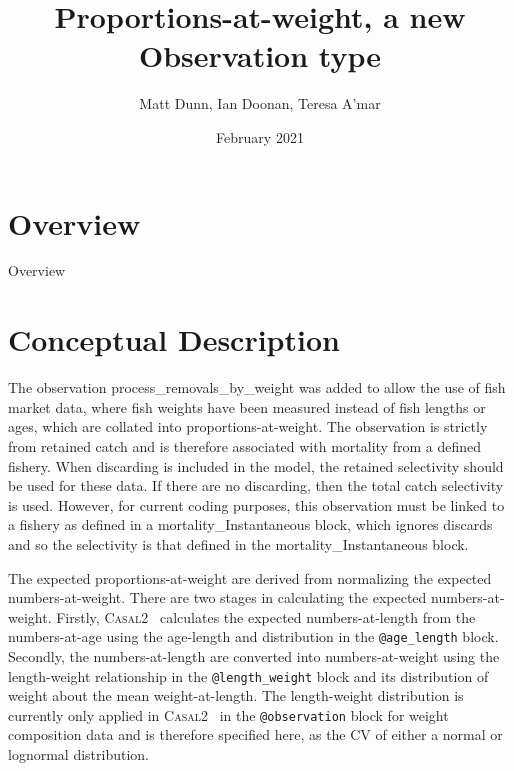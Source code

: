 \documentclass[a4paper,11pt,twoside,pdftex,draft]{article}
\title{Proportions-at-weight, a new Observation type}
\author{Matt Dunn, Ian Doonan, Teresa A'mar}
\date{February 2021}
\newcommand{\CNAME}{\textsc{Casal2}}
\begin{document}
\maketitle

\pagestyle{plain}
\setcounter{page}{1}


\newpage

\section{Overview}

Overview

\section{Conceptual Description}

The observation process\_removals\_by\_weight was added to allow the use of fish market data, where fish weights have been measured instead of fish lengths or ages, which are collated into proportions-at-weight. The observation is strictly from retained catch and is therefore associated with mortality from a defined fishery. When discarding is included in the model, the retained selectivity should be used for these data. If there are no discarding, then the total catch selectivity is used. However, for current coding purposes, this observation must be linked to a fishery as defined in a mortality\_Instantaneous block, which ignores discards and so the selectivity is that defined in the mortality\_Instantaneous block.

The expected proportions-at-weight are derived from normalizing the expected numbers-at-weight. There are two stages in calculating the expected numbers-at-weight. Firstly, \CNAME~ calculates the expected numbers-at-length from the numbers-at-age using the age-length and distribution in the \texttt{@age\_length} block. Secondly, the numbers-at-length are converted into numbers-at-weight using the length-weight relationship in the \texttt{@length\_weight} block and its distribution of weight about the mean weight-at-length. The length-weight distribution is currently only applied in \CNAME~ in the \texttt{@observation} block for weight composition data and is therefore specified here, as the CV of either a normal or lognormal distribution.
\end{document}
